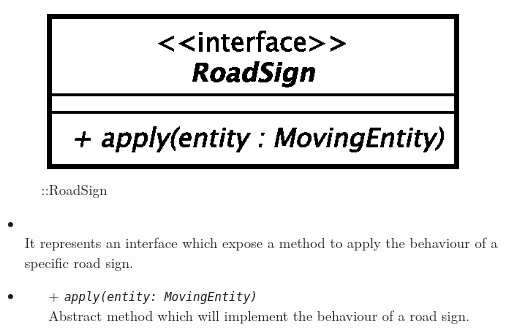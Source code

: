 \begin{figure}[h]
\centering
\includegraphics[scale=0.6,keepaspectratio]{images/solution/app/backend/road_sign.eps}
\caption{\pPassive::RoadSign}
\label{fig:sd-app-road-sign}
\end{figure}
\FloatBarrier
\begin{itemize}
  \item \textbf{\descr} \\
    It represents an interface which expose a method to apply the behaviour of a specific road sign.
  \item \textbf{\ops}
  \begin{itemize} 
    \item[+] \texttt{\textit{apply(entity: MovingEntity)}} \\
Abstract method which will implement the behaviour of a road sign.
  \end{itemize}
\end{itemize}
